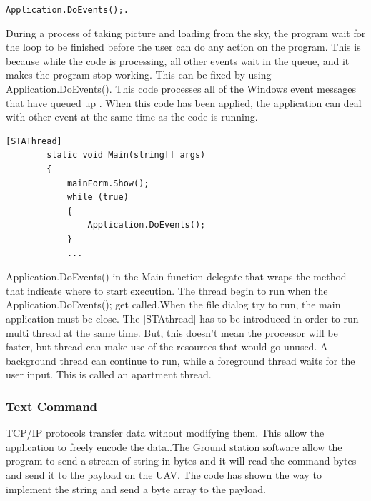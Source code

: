 \documentclass[oneside]{ecsgdp}         %
\begin{document}
\begin{center}
\texttt{Application.DoEvents();.}
\end{center}

During a process of taking picture and loading from the sky, the program wait for the loop to be finished before the user can do any action on the program. This is because while the code is processing, all other events wait in the queue, and it makes the program stop working. This can be fixed by using Application.DoEvents(). This code processes all of the Windows event messages that have queued up \cite{davidW}. When this code has been applied, the application can deal with other event at the same time as the code is running.


\begin{lstlisting}[caption={thread handling in the main},label=lst:threadH]
        [STAThread]        
        static void Main(string[] args)        
        {        
            mainForm.Show();
            while (true)            
            {            
                Application.DoEvents();                
            }
        	...
        \end{lstlisting}
        Application.DoEvents() in the Main function delegate that wraps the method that indicate where to start execution. The thread begin to run when the Application.DoEvents(); get called\cite{xieX}.When the file dialog try to run, the main application must be close. The [STAthread] has to be introduced in order to run multi thread at the same time. But, this doesn't mean the processor will be faster, but thread can make use of the resources that would go unused. A background thread can continue to run, while a foreground thread waits for the user input. This is called an apartment thread. 
        
\subsubsection*{Text Command}
TCP/IP protocols transfer data without modifying them. This allow the application to freely encode the data.\cite{davidB}.The Ground station software allow the program to send a stream of string in bytes and it will read the command bytes and send it to the payload on the UAV. The code has shown the way to implement the string and send a byte array to the payload.
	
	
\end{document}
